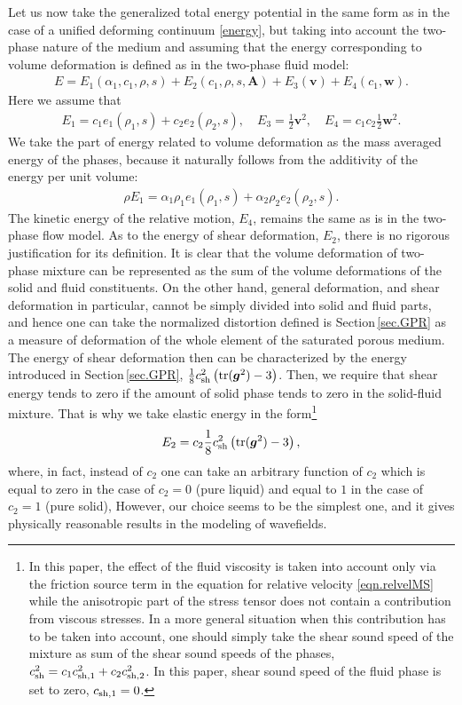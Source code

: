 \documentclass[3p,times,table]{article}
\renewcommand{\AA}{{\bm{A}}}
\renewcommand{\ggg}{{\bm{g}}}
\newcommand{\vv}{{\bm{v}}}
\newcommand{\ww}{{\bm{w}}}
\newcommand{\tr}{\textnormal{tr}}
\newcommand{\csh}{c_{\rm sh}}
\newcommand{\cshf}{c_{{\rm sh},1}}
\newcommand{\cshs}{c_{{\rm sh},2}}
\begin{document}
Let us now take the generalized total energy potential in the same form as in 
the case 
of a unified deforming continuum \eqref{energy}, but taking into account 
the two-phase nature of the medium and assuming that the energy corresponding to  
volume deformation is defined as in the two-phase fluid model: 
\begin{align}
E=E_1(\alpha_1, c_1, \rho, s)+E_2(c_1,\rho,s,\AA)+E_3(\vv)+E_4(c_1,\ww). 
\label{energy.SF}
\end{align}
Here we assume that 
\begin{align} \label{energy12.SF}
E_1=c_1e_1(\rho_1,s)+c_2e_2(\rho_2,s), \quad
E_3=\frac{1}{2}\vv^2, \quad E_4=c_1c_2\frac{1}{2}\ww^2.
\end{align}
We take the part of energy related to volume deformation as the mass 
averaged energy of the phases, because it naturally follows from the additivity 
of the energy per unit volume:
\begin{align} \label{energy.mix}
\rho E_1=\alpha_1 \rho_1e_1(\rho_1,s)+\alpha_2 \rho_2 e_2(\rho_2,s). 
\end{align}
The kinetic energy of the relative motion, $E_4$, remains the same as is in the 
two-phase flow model.
As to the energy of shear deformation, $E_2$, there is no rigorous 
justification for its definition. It is clear that the volume deformation of 
two-phase mixture can be represented as the sum of the volume deformations of the solid 
and fluid constituents. On the other hand, general deformation, and shear 
deformation in particular, cannot be 
simply divided into solid and fluid parts, and hence one can take the 
normalized 
distortion 
defined is Section\,\ref{sec.GPR} as a measure of deformation of the whole element 
of the saturated porous medium. The energy of shear deformation then can be 
characterized by the energy introduced in Section\,\ref{sec.GPR},
$
\frac18\csh^2\left(\tr({\ggg^2})-3\right)
$. 
Then, we require that shear energy tends to zero 
if the amount of solid phase tends to zero in the solid-fluid mixture. That is why we take elastic  
energy in the form\footnote{In this paper, the effect of the fluid viscosity is 
taken into account only via the friction source term in the equation for 
relative velocity \eqref{eqn.relvelMS} while the anisotropic part of the stress 
tensor does not contain a contribution from viscous stresses. In a more general 
situation when this contribution has to be taken into account, one should 
simply 
take the shear sound speed of the mixture as sum of the shear sound speeds of 
the phases, $ \csh^2 = c_1 \cshf^2 + c_2 \cshs^2 $. In this paper, shear sound 
speed of the fluid phase is set to zero, $ \cshf = 0 $.}
\begin{align} \label{energy,shear}
E_2=c_2 \frac{1}{8}\csh^2\left(\tr({\ggg^2})-3\right),
\end{align}
where, in fact, instead of $c_2$ one can take an arbitrary 
function of $c_2$ which is equal to zero in the case of $c_2=0$ (pure liquid) 
and 
equal to $1$ in the case of $c_2=1$ (pure solid),
However, our choice seems to be the simplest one, and it gives physically 
reasonable results in the modeling of wavefields.
\end{document}

